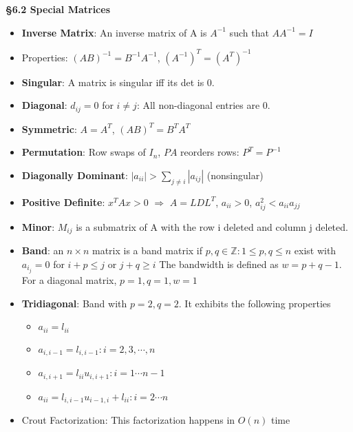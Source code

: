 \documentclass{article}
\begin{document}
\begin{tcolorbox}[colframe=black,colback=white,boxrule=0.3pt,arc=1pt,
left=0pt,right=0pt,top=0pt,bottom=0pt]
\begin{minipage}[t]{0.49\textwidth}
\textbf{\S6.2 Special Matrices}
\begin{itemize}
\item \textbf{Inverse Matrix}: An inverse matrix of A is $A^{-1}$ such that $AA^{-1}=I$
\item Properties: $(AB)^{-1}=B^{-1}A^{-1}$, $(A^{-1})^T=(A^T)^{-1}$
\item \textbf{Singular}: A matrix is singular iff its det is 0.
\item \textbf{Diagonal}: $d_{ij}=0$ for $i\neq j$: All non-diagonal entries are 0.
\item \textbf{Symmetric}: $A=A^T$, $(AB)^T=B^TA^T$
\item \textbf{Permutation}: Row swaps of $I_n$, $PA$ reorders rows: $P^T = P^{-1}$
\item \textbf{Diagonally Dominant}: $|a_{ii}| > \sum_{j\neq i}|a_{ij}|$ (nonsingular)
\item \textbf{Positive Definite}: $x^TAx>0$ $\Rightarrow$ $A=LDL^T$, $a_{ii}>0$, $a_{ij}^2<a_{ii}a_{jj}$
\item \textbf{Minor}: $M_{ij}$ is a submatrix of A with the row i deleted and column j deleted.
\item \textbf{Band}: an $n\times n$ matrix is a band matrix if $p,q\in \mathbb{Z}:1\le p, q\le n$ exist with $a_{i_j} = 0$ for $i+p\le j$ or $j+q\ge i$ The bandwidth is defined as $w=p+q-1$. For a diagonal matrix, $p=1,q=1,w=1$
\item \textbf{Tridiagonal}: Band with $p=2, q=2$. It exhibits the following properties
\begin{minipage}[t]{0.45\textwidth}
\begin{itemize}
    \item $a_{ii} = l_{ii}$
    \item $a_{i,i-1}=l_{i,i-1}: i=2,3,\cdots,n$
    \end{itemize}
    \end{minipage}
\begin{minipage}[t]{0.45\textwidth}
    \begin{itemize}
    \item $a_{i,i+1}=l_{ii}u_{i,i+1}:i=1\cdots n-1$
    \item $a_{ii} = l_{i,i-1}u_{i-1,i}+l_{ii}: i=2\cdots n$
\end{itemize}
\end{minipage}
\item Crout Factorization: This factorization happens in $O(n)$ time
\end{itemize}


\end{minipage}
\end{tcolorbox}
\end{document}
